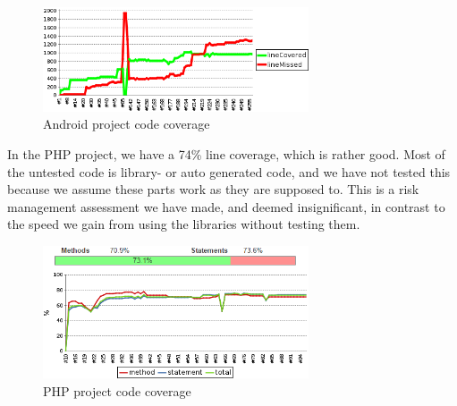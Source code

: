 \begin{figure}[!htbp]
    \centering
    \includegraphics[width=0.7\textwidth]{graphic/quality_assurance/jenkins_android_code_coverage}
    \caption{Android project code coverage}
    \label{fig:android_project_code_coverage}
\end{figure}
\FloatBarrier

\noindent
In the PHP project, we have a 74\% line coverage, which is rather good. Most of the untested code is library- or auto generated code, and we have not tested this because we assume these parts work as they are supposed to. This is a risk management assessment we have made, and deemed insignificant, in contrast to the speed we gain from using the libraries without testing them. %

\begin{figure}[!htbp]
    \centering
    \includegraphics[width=0.7\textwidth]{graphic/quality_assurance/jenkins_php_code_coverage}
    \caption{PHP project code coverage}
    \label{fig:php_project_code_coverage}
\end{figure}
\FloatBarrier